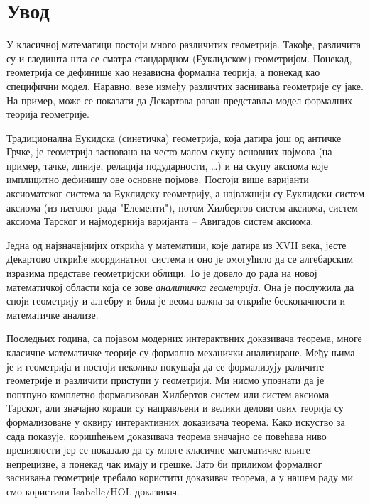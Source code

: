 \documentclass[a4paper, 12pt]{article}
\begin{document}
\section{Увод}
У класичној математици постоји много различитих геометрија. Такође,
различита су и гледишта шта се сматра стандардном (Еуклидском)
геометријом. Понекад, геометрија се дефинише као независна формална
теорија, а понекад као специфични модел. Наравно, везе између
различтих заснивања геометрије су јаке. На пример, може се показати да
Декартова раван представља модел формалних теорија геометрије.

Традиционална Еукидска (синетичка) геометрија, која датира још од
античке Грчке, је геометрија заснована на често малом скупу основних
појмова (на пример, тачке, линије, релација подударности, \ldots) и на
скупу аксиома које имплицитно дефинишу ове основне појмове.  Постоји
више варијанти аксиоматског система за Еуклидску геометрију, а
најважнији су Еуклидски систем аксиома (из његовог рада "Елементи"),
потом Хилбертов систем аксиома\cite{hilbert}, систем аксиома
Тарског\cite{tarski} и најмодернија варијанта -- Авигадов систем
аксиома\cite{avigad}.

Једна од најзначајнијих открића у математици, које датира из XVII
века, јесте Декартово откриће координатног система и оно је омогућило
да се алгебарским изразима представе геометријски облици. То је довело
до рада на новој математичкој области која се зове \emph{аналитичка
  геометрија}. Она је послужила да споји геометрију и алгебру и била
је веома важна за откриће бесконачности и математичке анализе.

Последњих година, са појавом модерних интерактвних доказивача теорема,
многе класичне математичке теорије су формално механички
анализиране. Међу њима је и геометрија и постоји неколико покушаја да
се формализују раличите геометрије и различити приступи у
геометрији. Ми нисмо упознати да је поптпуно комплетно формализован
Хилбертов систем\cite{hilbert} или систем аксиома
Тарског\cite{tarski}, али значајно кораци су направљени и велики
делови ових теорија су формализоване у оквиру интерактивних доказивача
теорема\cite{hilbert-isabelle,narboux,projective-coq1}.  Како искуство
за сада показује, коришћењем доказивача теорема значајно се повећава
ниво прецизности јер се показало да су многе класичне математичке
књиге непрецизне, а понекад чак имају и грешке. Зато би приликом
формалног заснивања геометрије требало користити доказивач теорема, а
у нашем раду ми смо користили Isabelle/HOL\cite{Isabelle} доказивач.
\end{document}
